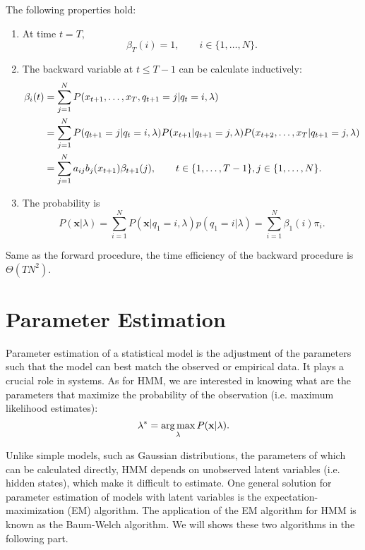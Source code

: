 \documentclass[12pt,final,twoside]{report}
\begin{document}
The following properties hold:
\begin{enumerate}
  \item At time $t = T$,
    \begin{equation}
      \beta_T(i) = 1, \qquad i \in \{1,\dots,N\} .
    \end{equation}
  \item The backward variable at $t \leq T - 1$ can be calculate inductively:
    \begin{align}
      \beta_i(t) &= \sum_{j=1}^{N} P(x_{t+1},\dots,x_T,q_{t+1}=j|q_t=i,\lambda) \notag\\
      &= \sum_{j=1}^{N} P(q_{t+1}=j|q_t=i,\lambda) P(x_{t+1}|q_{t+1}=j,\lambda) P(x_{t+2},\dots,x_T|q_{t+1}=j,\lambda) \notag\\
      &= \sum_{j=1}^{N} a_{ij} b_j(x_{t+1}) \beta_{t+1}(j) , \qquad t \in \{1,\dots,T - 1\}, j \in \{1,\dots,N\} .
    \end{align}
  \item The probability is
    \begin{equation}
      P(\mathbf{x}|\lambda) = \sum_{i=1}^N P(\mathbf{x}|q_1=i,\lambda) p(q_1=i|\lambda) = \sum_{i=1}^N \beta_1(i) \pi_i .
    \end{equation}
\end{enumerate}

Same as the forward procedure, the time efficiency of the backward procedure is $\Theta(TN^2)$.

\section{Parameter Estimation}
Parameter estimation of a statistical model is the adjustment of the parameters such that the model can best match the observed or empirical data. It plays a crucial role in systems. As for HMM, we are interested in knowing what are the parameters that maximize the probability of the observation (i.e. maximum likelihood estimates):
\begin{equation}
  \lambda^* = \operatorname*{arg\,max}_{\lambda} P(\mathbf{x}|\lambda) .
\end{equation}

Unlike simple models, such as Gaussian distributions, the parameters of which can be calculated directly, HMM depends on unobserved latent variables (i.e. hidden states), which make it difficult to estimate. One general solution for parameter estimation of models with latent variables is the expectation-maximization (EM) algorithm. The application of the EM algorithm for HMM is known as the Baum-Welch algorithm. We will shows these two algorithms in the following part.
\end{document}
